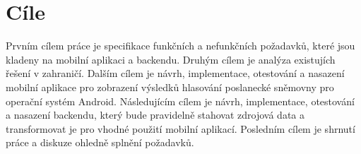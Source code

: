 \chapter{Cíle}

\setcounter{page}{1}

Prvním cílem práce je specifikace funkčních a nefunkčních požadavků, které jsou kladeny na mobilní aplikaci a backendu. Druhým cílem je analýza existujích řešení v zahraničí. Dalším cílem je návrh, implementace, otestování a nasazení mobilní aplikace pro zobrazení výsledků hlasování poslanecké sněmovny pro operační systém Android. Následujícím cílem je návrh, implementace, otestování a nasazení backendu, který bude pravidelně stahovat zdrojová data a transformovat je pro vhodné použití mobilní aplikací. Posledním cílem je shrnutí práce a diskuze ohledně splnění požadavků.